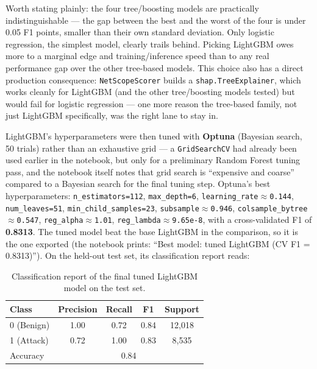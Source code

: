 \documentclass[12pt,a4paper]{report}
\begin{document}
Worth stating plainly: the four tree/boosting models are practically indistinguishable --- the gap between the best and the worst of the four is under 0.05 F1 points, smaller than their own standard deviation. Only logistic regression, the simplest model, clearly trails behind. Picking LightGBM owes more to a marginal edge and training/inference speed than to any real performance gap over the other tree-based models. This choice also has a direct production consequence: \texttt{NetScopeScorer} builds a \texttt{shap.TreeExplainer}, which works cleanly for LightGBM (and the other tree/boosting models tested) but would fail for logistic regression --- one more reason the tree-based family, not just LightGBM specifically, was the right lane to stay in.

LightGBM's hyperparameters were then tuned with \textbf{Optuna} (Bayesian search, 50 trials) rather than an exhaustive grid --- a \texttt{GridSearchCV} had already been used earlier in the notebook, but only for a preliminary Random Forest tuning pass, and the notebook itself notes that grid search is ``expensive and coarse'' compared to a Bayesian search for the final tuning step. Optuna's best hyperparameters: \texttt{n\_estimators=112}, \texttt{max\_depth=6}, \texttt{learning\_rate$\approx$0.144}, \texttt{num\_leaves=51}, \texttt{min\_child\_samples=23}, \texttt{subsample$\approx$0.946}, \texttt{colsample\_bytree$\approx$0.547}, \texttt{reg\_alpha$\approx$1.01}, \texttt{reg\_lambda$\approx$9.65e-8}, with a cross-validated F1 of \textbf{0.8313}. The tuned model beat the base LightGBM in the comparison, so it is the one exported (the notebook prints: ``Best model: tuned LightGBM (CV F1 = 0.8313)''). On the held-out test set, its classification report reads:

\begin{table}[h]
\centering
\small
\begin{tabular}{@{}lcccc@{}}
\toprule
\textbf{Class} & \textbf{Precision} & \textbf{Recall} & \textbf{F1} & \textbf{Support} \\
\midrule
0 (Benign) & 1.00 & 0.72 & 0.84 & 12,018 \\
1 (Attack) & 0.72 & 1.00 & 0.83 & 8,535 \\
\midrule
Accuracy & \multicolumn{4}{c}{0.84} \\
\bottomrule
\end{tabular}
\caption{Classification report of the final tuned LightGBM model on the test set.}
\end{table}
\end{document}
